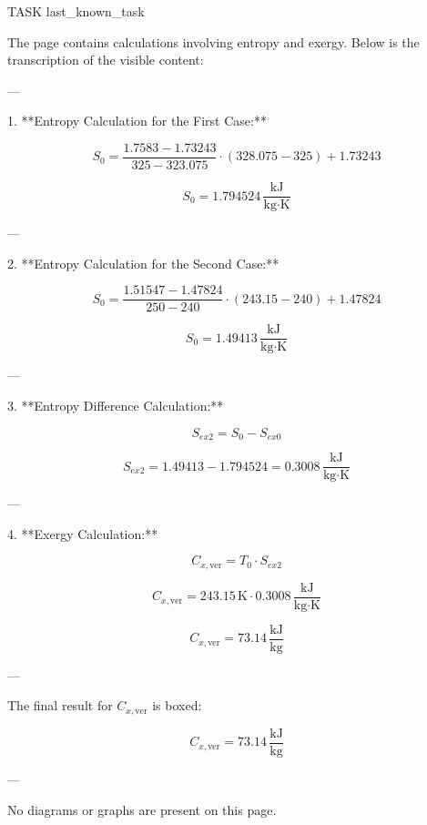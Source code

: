 TASK {last_known_task}

The page contains calculations involving entropy and exergy. Below is the transcription of the visible content:

---

1. **Entropy Calculation for the First Case:**

\[
S_0 = \frac{1.7583 - 1.73243}{325 - 323.075} \cdot (328.075 - 325) + 1.73243
\]

\[
S_0 = 1.794524 \, \frac{\text{kJ}}{\text{kg·K}}
\]

---

2. **Entropy Calculation for the Second Case:**

\[
S_0 = \frac{1.51547 - 1.47824}{250 - 240} \cdot (243.15 - 240) + 1.47824
\]

\[
S_0 = 1.49413 \, \frac{\text{kJ}}{\text{kg·K}}
\]

---

3. **Entropy Difference Calculation:**

\[
S_{ex2} = S_0 - S_{ex0}
\]

\[
S_{ex2} = 1.49413 - 1.794524 = 0.3008 \, \frac{\text{kJ}}{\text{kg·K}}
\]

---

4. **Exergy Calculation:**

\[
C_{x,\text{ver}} = T_0 \cdot S_{ex2}
\]

\[
C_{x,\text{ver}} = 243.15 \, \text{K} \cdot 0.3008 \, \frac{\text{kJ}}{\text{kg·K}}
\]

\[
C_{x,\text{ver}} = 73.14 \, \frac{\text{kJ}}{\text{kg}}
\]

---

The final result for \( C_{x,\text{ver}} \) is boxed:

\[
C_{x,\text{ver}} = 73.14 \, \frac{\text{kJ}}{\text{kg}}
\]

---

No diagrams or graphs are present on this page.
